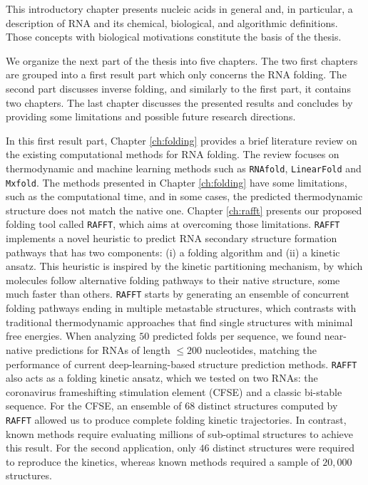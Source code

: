 This introductory chapter presents nucleic acids in general and, in particular, a description of RNA and its chemical, biological, and algorithmic definitions. Those concepts with biological motivations constitute the basis of the thesis. 

We organize the next part of the thesis into five chapters. The two first chapters are grouped into a first result part which only concerns the RNA folding. The second part discusses inverse folding, and similarly to the first part, it contains two chapters. The last chapter discusses the presented results and concludes by providing some limitations and possible future research directions. 

In this first result part, Chapter \ref{ch:folding} provides a brief literature review on the existing computational methods for RNA folding. The review focuses on thermodynamic and machine learning methods such as \texttt{RNAfold}, \texttt{LinearFold} and \texttt{Mxfold}. The methods presented in Chapter \ref{ch:folding} have some limitations, such as the computational time, and in some cases, the predicted thermodynamic structure does not match the native one. Chapter \ref{ch:rafft} presents our proposed folding tool called \texttt{RAFFT}, which aims at overcoming those limitations. \texttt{RAFFT} implements a novel heuristic to predict RNA secondary structure formation pathways that has two components: (i) a folding algorithm and (ii) a kinetic ansatz. This heuristic is inspired by the kinetic partitioning mechanism, by which molecules follow alternative folding pathways to their native structure, some much faster than others. \texttt{RAFFT} starts by generating an ensemble of concurrent folding pathways ending in multiple metastable structures, which contrasts with traditional thermodynamic approaches that find single structures with minimal free energies. When analyzing $50$ predicted folds per sequence, we found near-native predictions for RNAs of length $\leq 200$ nucleotides, matching the performance of current deep-learning-based structure prediction methods. \texttt{RAFFT} also acts as a folding kinetic ansatz, which we tested on two RNAs: the coronavirus frameshifting stimulation element (CFSE) and a classic bi-stable sequence. For the CFSE, an ensemble of $68$ distinct structures computed by \texttt{RAFFT} allowed us to produce complete folding kinetic trajectories. In contrast, known methods require evaluating millions of sub-optimal structures to achieve this result. For the second application, only $46$ distinct structures were required to reproduce the kinetics, whereas known methods required a sample of $20,000$ structures. 

